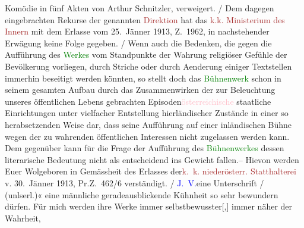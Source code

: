 {{{                        Komödie in fünf Akten von Arthur Schnitzler, verweigert.{ / }Dem dagegen eingebrachten Rekurse der genannten \textcolor{brown}{Direktion} hat das \textcolor{brown}{k.k. Ministerium des Innern} mit dem Erlasse vom
                           25. Jänner 1913, Z. 1962, in nachstehender Erwägung keine
                        Folge gegeben.{ / }{\pb}Wenn auch die Bedenken, die gegen die Aufführung
                        des \textcolor{green}{Werkes} vom
                        Standpunkte der Wahrung religiöser Gefühle der Bevölkerung vorliegen, durch
                        Striche oder durch Aenderung einiger Textstellen immerhin beseitigt werden
                        könnten, so stellt doch das \textcolor{green}{Bühnenwerk} schon in seinem gesamten Aufbau durch
                        das Zusammenwirken der zur Beleuchtung unseres öffentlichen Lebens
                        gebrachten Episoden\textcolor{pink}{österreichische}
                        staatliche Einrichtungen unter vielfacher Entstellung hierländischer
                        Zustände in einer so herabsetzenden Weise dar, dass seine Aufführung auf
                        einer inländischen Bühne wegen der zu wahrenden öffentlichen Interessen
                        nicht zugelassen werden kann. Dem gegenüber kann für die Frage der
                        Aufführung des \textcolor{green}{Bühnenwerkes} dessen
                        literarische Bedeutung nicht als entscheidend ins Gewicht fallen.– Hievon
                        werden Euer Wolgeboren in Gemässheit des Erlasses der\textcolor{brown}{k. k. niederösterr. Statthalterei} v.
                           30. Jänner 1913, Pr.Z. 462/6 verständigt.{ / }\textcolor{blue}{J. V.}eine Unterschrift{ / }(unlserl.)«}}}\label{K_L03641-1} eine männliche geradeausblickende Kühnheit so sehr bewundern
               dürfen. Für mich werden ihre Werke immer selbstbewusster{[},{]} immer näher der Wahrheit,
